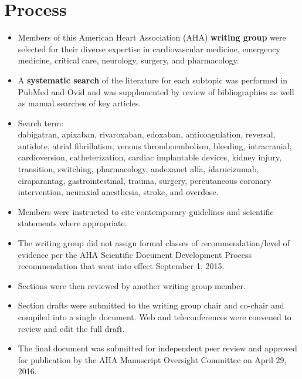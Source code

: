 \documentclass{article}
\begin{document}
\section{Process}
\begin{itemize}
	\item Members of this American Heart Association (AHA) \textbf{writing group} were selected for their diverse expertise in cardiovascular medicine, emergency medicine, critical care, neurology, surgery, and pharmacology.
	\item A \textbf{systematic search} of the literature for each subtopic was performed in PubMed and Ovid and was supplemented by review of bibliographies as well as manual searches of key articles.
	\item  Search term:\\
	dabigatran, apixaban, rivaroxaban, edoxaban, anticoagulation, reversal, antidote, atrial fibrillation, venous thromboembolism, bleeding, intracranial, cardioversion, catheterization, cardiac implantable devices, kidney injury, transition, switching, pharmacology, andexanet alfa, idarucizumab, ciraparantag, gastrointestinal, trauma, surgery, percutaneous coronary intervention, neuraxial anesthesia, stroke, and overdose.
	\item Members were instructed to cite contemporary guidelines and scientific statements where appropriate.
	\item The writing group did not assign formal classes of recommendation/level of evidence per the AHA Scientific Document Development Process recommendation that went into effect September 1, 2015. 
	\item Sections were then reviewed by another writing group member. 
	\item Section drafts were submitted to the writing group chair and co-chair and compiled into a single document. Web and teleconferences were convened to review and edit the full draft.
	\item The final document was submitted for independent peer review and approved for publication by the AHA Manuscript Oversight Committee on April 29, 2016.
\end{itemize}
\end{document}
